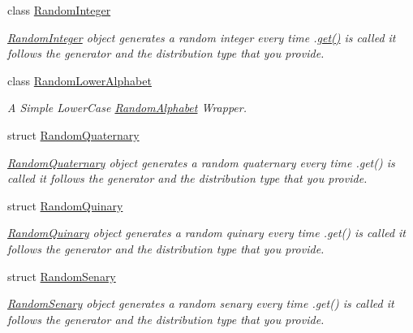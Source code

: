 \begin{DoxyCompactItemize}
class \mbox{\hyperlink{classtestcaser_1_1maker_1_1types_1_1RandomInteger}{Random\+Integer}}
\begin{DoxyCompactList}\small\item\em \mbox{\hyperlink{classtestcaser_1_1maker_1_1types_1_1RandomInteger}{Random\+Integer}} object generates a random integer every time .\mbox{\hyperlink{classtestcaser_1_1maker_1_1types_1_1RandomInteger_a3b7754ca1c579f58b959ca6adb483a51}{get()}} is called it follows the generator and the distribution type that you provide. \end{DoxyCompactList}\item 
class \mbox{\hyperlink{classtestcaser_1_1maker_1_1types_1_1RandomLowerAlphabet}{Random\+Lower\+Alphabet}}
\begin{DoxyCompactList}\small\item\em A Simple Lower\+Case \mbox{\hyperlink{classtestcaser_1_1maker_1_1types_1_1RandomAlphabet}{Random\+Alphabet}} Wrapper. \end{DoxyCompactList}\item 
struct \mbox{\hyperlink{structtestcaser_1_1maker_1_1types_1_1RandomQuaternary}{Random\+Quaternary}}
\begin{DoxyCompactList}\small\item\em \mbox{\hyperlink{structtestcaser_1_1maker_1_1types_1_1RandomQuaternary}{Random\+Quaternary}} object generates a random quaternary every time .get() is called it follows the generator and the distribution type that you provide. \end{DoxyCompactList}\item 
struct \mbox{\hyperlink{structtestcaser_1_1maker_1_1types_1_1RandomQuinary}{Random\+Quinary}}
\begin{DoxyCompactList}\small\item\em \mbox{\hyperlink{structtestcaser_1_1maker_1_1types_1_1RandomQuinary}{Random\+Quinary}} object generates a random quinary every time .get() is called it follows the generator and the distribution type that you provide. \end{DoxyCompactList}\item 
struct \mbox{\hyperlink{structtestcaser_1_1maker_1_1types_1_1RandomSenary}{Random\+Senary}}
\begin{DoxyCompactList}\small\item\em \mbox{\hyperlink{structtestcaser_1_1maker_1_1types_1_1RandomSenary}{Random\+Senary}} object generates a random senary every time .get() is called it follows the generator and the distribution type that you provide. \end{DoxyCompactList}\item 

\end{DoxyCompactItemize}
